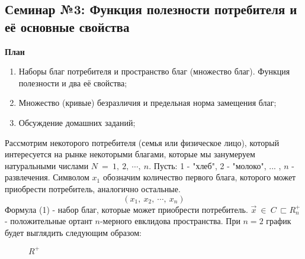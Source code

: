\documentclass[12pt,a4paper]{article}
\author{GH-TIMe}
\begin{document}
\begin{center}
\section*{Семинар №3: Функция полезности потребителя и её основные свойства}
\textbf{План}
\end{center}

\begin{enumerate}
\item Наборы благ потребителя и пространство благ (множество благ). Функция полезности и два её свойства;
\item Множество (кривые) безразличия и предельная норма замещения благ;
\item Обсуждение домашних заданий;
\end{enumerate}

	Рассмотрим некоторого потребителя (семья или физическое лицо), который интересуется на рынке некоторыми благами, которые мы занумеруем натуральными числами $\displaystyle N\ =\ 1,\ 2,\ \cdots ,\ n$. Пусть: 1 - "хлеб", 2 - "молоко", ... , $\displaystyle n$ - развлечения. Символом $\displaystyle x_{1}$ обозначим количество первого блага, которого может приобрести потребитель, аналогично остальные.
\begin{equation*}
( x_{1} ,\ x_{2} ,\ \cdots ,\ x_{n})
\end{equation*}
	Формула (1) - набор благ, которые может приобрести потребитель. $\displaystyle \vec{x} \ \in \ C\ \sqsubset R^{+}_{n}$ - положительные ортант $\displaystyle n$-мерного евклидова пространства. При $\displaystyle n=2$ график будет выглядить следующим образом:

\begin{figure}

\begin{center}

\end{center}
\caption{$R^+$}
\end{figure}
\end{document}
